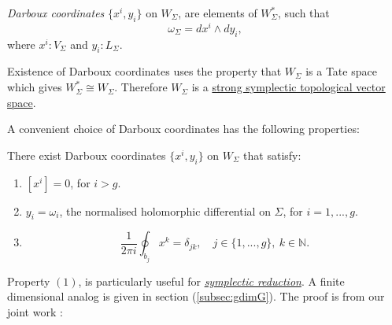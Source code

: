         \begin{defn}  \label{darbcoord}
        \emph{Darboux coordinates} \(\{x^i,y_i\}\) on \(W_\Sigma\), are elements of \(W_\Sigma^* \), such that  \[\omega_{\Sigma} =dx^i\wedge dy_i,\]
        where
        \( x^i : V_\Sigma \) 
        and \( y_i :  L_\Sigma \).
        \end{defn}
        Existence of Darboux coordinates uses the property that \(W_\Sigma\) is a Tate space which gives \(W_\Sigma^* \cong W_\Sigma\). Therefore \(W_\Sigma \) is a \hyperref[defn:strongsympl]{strong symplectic topological vector space}.  
        
        A convenient choice of Darboux coordinates has the following properties:
        \begin{prop}
        \label{prop:nice}
        There exist Darboux coordinates \( \{x^i, y_i\}\) on \(W_\Sigma\) that satisfy:
        \begin{enumerate}
            \item \([x^{i} ]= 0\), for \( i > g\).
            \item \(y_i=\omega_i\), the normalised holomorphic differential on \(\Sigma\), for \(i=1,...,g\).
            \item \[ 
            \frac{1}{2\pi i}\oint_{b_j}x^k=\delta_{jk},\quad j\in\{1,...,g\},\ k\in \mathbb{N} .\]
        \end{enumerate}
        \end{prop}
        Property \((1)\), is particularly useful for \emph{\hyperref[chapter:symplecticreduction]{symplectic reduction}}. A finite dimensional analog is given in section (\ref{subsec:gdimG}). The proof is from our joint work \cite{chaimanowong2020airy}:
 
